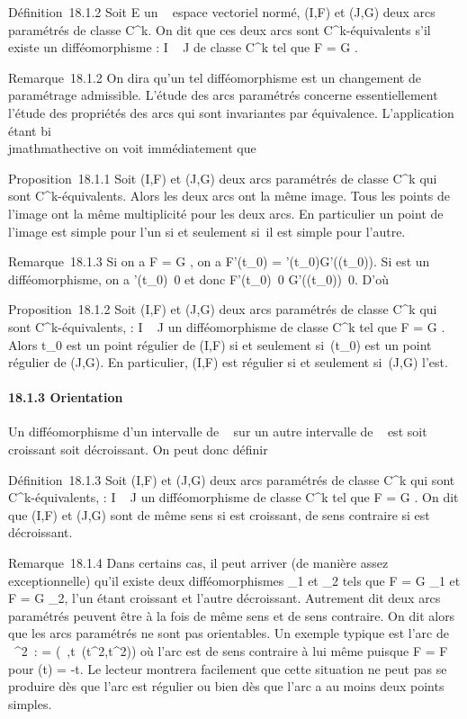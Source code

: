 \documentclass[]{article}
\begin{document}
Définition~18.1.2 Soit E un ~ espace vectoriel normé, (I,F) et (J,G)
deux arcs paramétrés de classe C^k. On dit que ces deux arcs
sont C^k-équivalents s'il existe un difféomorphisme \theta : I \rightarrow~ J
de classe C^k tel que F = G \cdot \theta.

Remarque~18.1.2 On dira qu'un tel difféomorphisme est un changement de
paramétrage admissible. L'étude des arcs paramétrés concerne
essentiellement l'étude des propriétés des arcs qui sont invariantes par
équivalence. L'application \theta étant bi\\jmathmathective on voit immédiatement que

Proposition~18.1.1 Soit (I,F) et (J,G) deux arcs paramétrés de classe
C^k qui sont C^k-équivalents. Alors les deux arcs
ont la même image. Tous les points de l'image ont la même multiplicité
pour les deux arcs. En particulier un point de l'image est simple pour
l'un si et seulement si~il est simple pour l'autre.

Remarque~18.1.3 Si on a F = G \cdot \theta, on a F'(t_0) =
\theta'(t_0)G'(\theta(t_0)). Si \theta est un difféomorphisme, on a
\theta'(t_0)\neq~0 et donc
F'(t_0)\neq~0
\Leftrightarrow
G'(\theta(t_0))\neq~0. D'où

Proposition~18.1.2 Soit (I,F) et (J,G) deux arcs paramétrés de classe
C^k qui sont C^k-équivalents, \theta : I \rightarrow~ J un
difféomorphisme de classe C^k tel que F = G \cdot \theta. Alors
t_0 est un point régulier de (I,F) si et seulement
si~\theta(t_0) est un point régulier de (J,G). En particulier, (I,F)
est régulier si et seulement si~(J,G) l'est.

\paragraph{18.1.3 Orientation}

Un difféomorphisme d'un intervalle de ~ sur un autre intervalle de ~ est
soit croissant soit décroissant. On peut donc définir

Définition~18.1.3 Soit (I,F) et (J,G) deux arcs paramétrés de classe
C^k qui sont C^k-équivalents, \theta : I \rightarrow~ J un
difféomorphisme de classe C^k tel que F = G \cdot \theta. On dit que
(I,F) et (J,G) sont de même sens si \theta est croissant, de sens contraire
si \theta est décroissant.

Remarque~18.1.4 Dans certains cas, il peut arriver (de manière assez
exceptionnelle) qu'il existe deux difféomorphismes \theta_1 et
\theta_2 tels que F = G \cdot \theta_1 et F = G \cdot \theta_2, l'un
étant croissant et l'autre décroissant. Autrement dit deux arcs
paramétrés peuvent être à la fois de même sens et de sens contraire. On
dit alors que les arcs paramétrés ne sont pas orientables. Un exemple
typique est l'arc de ~^2~: \Gamma =
(~,t\mapsto~(t^2,t^2)) où
l'arc est de sens contraire à lui même puisque F \cdot \theta = F pour \theta(t) = -t.
Le lecteur montrera facilement que cette situation ne peut pas se
produire dès que l'arc est régulier ou bien dès que l'arc a au moins
deux points simples.
\end{document}
